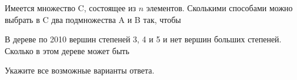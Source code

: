 \documentclass[addpoints, answers]{exam} %
\begin{document}
\begin{questions}
\question Имеется множество C, состоящее из $n$ элементов. Сколькими способами можно выбрать в C два подмножества A и B так, чтобы
\question В дереве по 2010 вершин степеней 3, 4 и 5 и нет вершин больших степеней. Сколько в этом дереве может быть
Укажите все возможные варианты ответа.
\end{questions}


\end{document}
